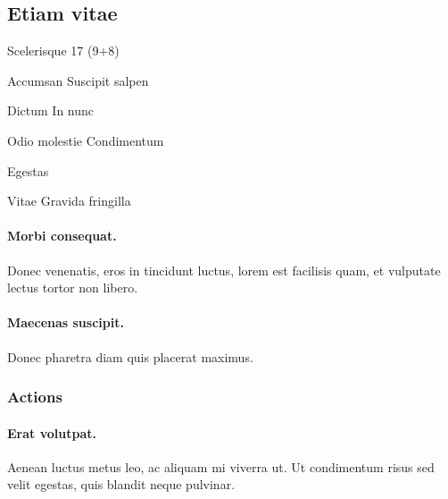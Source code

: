 \begin{phStatBlock}
\subsection*{Etiam vitae}
\phSBSep
\begin{phStatBlockDescription}
\item[Scelerisque] 17 (9+8)
\item[Accumsan] Suscipit salpen
\item[Dictum] In nunc
\end{phStatBlockDescription}
\phSBSep
{}
\phSBSep
\begin{phStatBlockDescription}
\item[Odio molestie] Condimentum
\item[Egestas] \phNone
\item[Vitae] Gravida fringilla
\end{phStatBlockDescription}
\phSBSep

\paragraph*{Morbi consequat.} Donec venenatis, eros in tincidunt luctus, lorem est facilisis quam, et vulputate lectus tortor non libero.

\paragraph*{Maecenas suscipit.} Donec pharetra diam quis placerat maximus.

\subsubsection*{Actions}

\paragraph*{Erat volutpat.} Aenean luctus metus leo, ac aliquam mi viverra ut. Ut condimentum risus sed velit egestas, quis blandit neque pulvinar.

\end{phStatBlock}




\phAppendix

 \lipsum[126]

\backmatter

 \lipsum[127]


